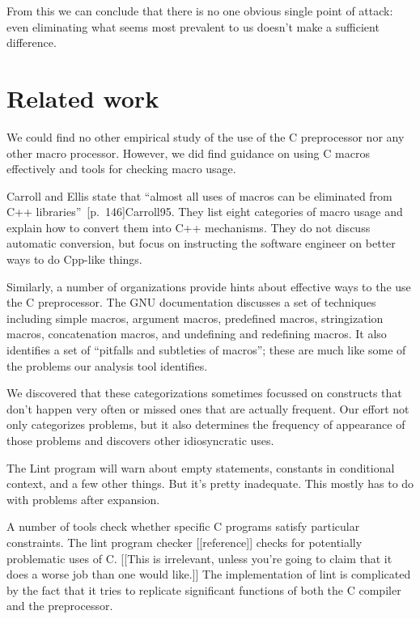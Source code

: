 \documentclass[10pt]{article}
\begin{document}
    From this we can conclude that there is no one obvious single point of
      attack:  even eliminating what seems most prevalent to us doesn't
      make a sufficient difference.



\section{Related work}
\label{sec:related}


We could find no other empirical study of the use of the C preprocessor nor
any other macro processor.  However, we did find guidance on using C macros
effectively and tools for checking macro usage.

Carroll and Ellis state that ``almost all uses of macros can be eliminated
from C++ libraries''~[p.~146]{Carroll95}.  They list eight categories
of macro usage and explain how to convert them into C++ mechanisms.  They
do not discuss automatic conversion, but focus on instructing the software
engineer on better ways to do Cpp-like things.

Similarly, a number of organizations provide hints about effective ways to
the use the C preprocessor.  The GNU documentation discusses
a set of techniques including simple macros, argument macros, predefined
macros, stringization macros, concatenation macros, and undefining and
redefining macros.  It also identifies a set of ``pitfalls and subtleties
of macros''; these are much like some of the problems our analysis tool
identifies.

We discovered that these categorizations sometimes focussed on constructs
that don't happen very often or missed ones that are actually frequent.
Our effort not only categorizes problems, but it also determines the
frequency of appearance of those problems and discovers other idiosyncratic
uses.

The Lint program will warn about empty statements, constants in conditional
context, and a few other things.  But it's pretty inadequate.  This mostly
has to do with problems after expansion.

A number of tools check whether specific C programs satisfy particular
constraints.  The lint program checker [[reference]]
checks for potentially problematic uses of C\@.  
[[This is irrelevant, unless you're going to claim that it does a worse job
than one would like.]]
The implementation of lint
is complicated by the fact that it tries to replicate significant functions
of both the C compiler and the preprocessor.
\end{document}
